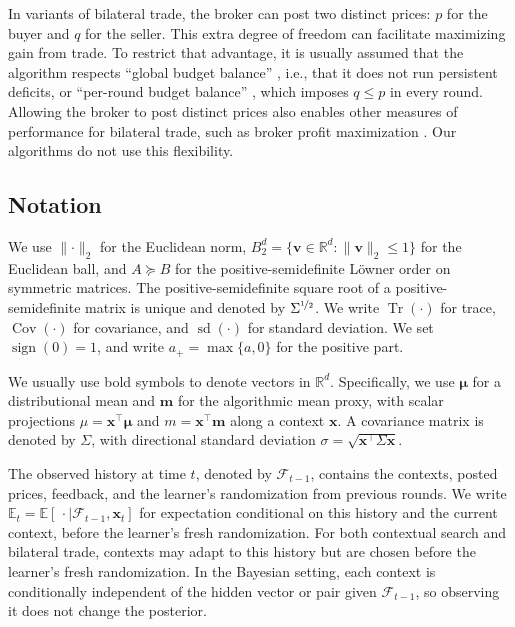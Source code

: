 \documentclass[11pt]{article}
\newcommand{\E}[1]{\mathbb E\left[#1\right]}
\newcommand{\R}{\mathbb R}
\newcommand{\Rbb}{\mathbb R}
\newcommand{\Et}{\mathbb E_t}
\DeclareMathOperator{\Cov}{Cov}
\DeclareMathOperator{\sd}{sd}
\DeclareMathOperator{\Tr}{Tr}
\newcommand{\norm}[1]{\lVert #1\rVert_2}
\newcommand{\bmu}{\boldsymbol\mu}
\newcommand{\bm}{\boldsymbol m}
\newcommand{\bx}{\boldsymbol x}
\begin{document}
In variants of bilateral trade, the broker can post two distinct prices: $p$ for the buyer and $q$ for the seller. This extra degree of freedom can facilitate maximizing gain from trade. To restrict that advantage, it is usually assumed that the algorithm respects ``global budget balance'' \cite{BCCF24}, i.e., that it does not run persistent deficits,  or ``per-round budget balance'' \cite{Cesa-BianchiCCF24}, which imposes $q\leq p$ {in every round}. Allowing the broker to post distinct prices also enables other measures of performance for bilateral trade, such as broker profit maximization \cite{GBCCP25,DiGregorioDFS25}. Our algorithms do not use this flexibility. 






\subsection{Notation}\label{sec:notation}

We use $\norm{\cdot}$ for the Euclidean norm, $B_2^d=\{\boldsymbol v\in\R^d:\norm{\boldsymbol v}\le1\}$ for the {Euclidean} ball, and $A\succeq B$ for the positive-semidefinite L\"owner order on symmetric matrices. The {positive-semidefinite square root} of a positive-semidefinite matrix is unique and denoted by $\Sigma^{\nicefrac12}$. We write $\Tr(\cdot)$ for trace, $\Cov(\cdot)$ for covariance, and $\sd(\cdot)$ for standard deviation. We set $\operatorname{sign}(0)=1${, and write} $a_+=\max\{a,0\}$ {for the positive part}.

We usually use bold symbols to denote vectors in $\Rbb^d$. Specifically, we use $\bmu$ for a distributional mean and $\bm$ for the algorithmic mean proxy, with scalar projections $\mu=\bx^\top\bmu$ and $m=\bx^\top\bm$ along a context $\bx$. A covariance matrix is denoted by $\Sigma$, with directional standard deviation $\sigma=\sqrt{\bx^\top\Sigma\bx}$. 

The observed history at time $t$, denoted by $\mathcal F_{t-1}$, contains the contexts, posted prices, feedback, and the learner's randomization from previous rounds. We write $\Et=\E{\,\cdot\mid\mathcal F_{t-1},\bx_t}$ for expectation conditional on this history and the current context, before the learner's fresh randomization. For both contextual search and bilateral trade, contexts may adapt to this history but are chosen before the learner's fresh randomization. In the Bayesian setting, each context is conditionally independent of the hidden vector or pair given $\mathcal F_{t-1}$, so observing it does not change the posterior.
\end{document}
